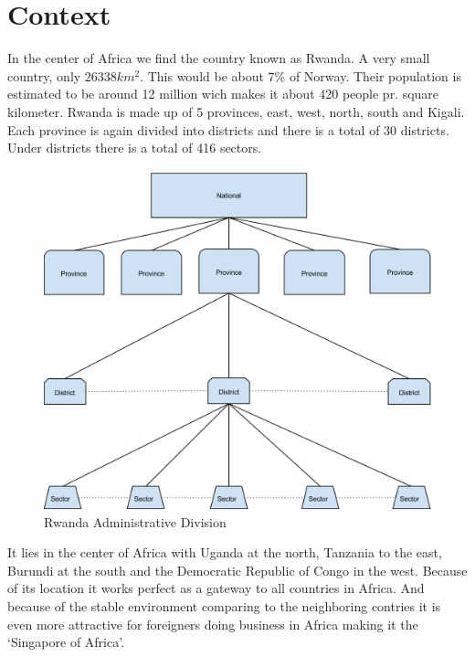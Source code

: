 \chapter{Context}
In the center of Africa we find the country known as Rwanda. A very small country, only \(26338 km^2\). This would be about 7\% of Norway. 
Their population is estimated to be around 12 million wich makes it about 420 people pr. square kilometer. 
Rwanda is made up of 5 provinces, east, west, north, south and Kigali. 
Each province is again divided into districts and there is a total of 30 districts. Under districts there is a total of 416 sectors\cite{1}.
\begin{figure}
\centering
\includegraphics[width=12cm]{empirical/images/rwanda_administrative_division}
\caption{Rwanda Administrative Division}
\end{figure}
It lies in the center of Africa with Uganda at the north, Tanzania to the east, Burundi at the south and the Democratic Republic of Congo in the west. Because of its location it works perfect as a gateway to all countries in Africa. 
And because of the stable environment comparing to the neighboring contries it is even more attractive for foreigners doing business in Africa making it the `Singapore of Africa'.

